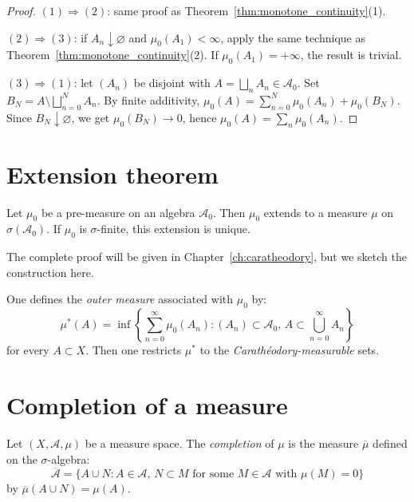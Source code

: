 \begin{proof}
$(1) \Rightarrow (2)$: same proof as Theorem~\ref{thm:monotone_continuity}(1).

$(2) \Rightarrow (3)$: if $A_n \downarrow \varnothing$ and
$\mu_0(A_1) < \infty$, apply the same technique as
Theorem~\ref{thm:monotone_continuity}(2). If $\mu_0(A_1) = +\infty$, the result is
trivial.

$(3) \Rightarrow (1)$: let $(A_n)$ be disjoint with $A = \bigsqcup_n A_n \in
\mathcal{A}_0$. Set $B_N = A \setminus \bigsqcup_{n=0}^{N} A_n$. By finite
additivity, $\mu_0(A) = \sum_{n=0}^{N} \mu_0(A_n) + \mu_0(B_N)$. Since
$B_N \downarrow \varnothing$, we get $\mu_0(B_N) \to 0$, hence
$\mu_0(A) = \sum_n \mu_0(A_n)$.
\end{proof}

\section{Extension theorem}

\begin{theorem}
\label{thm:extension_preliminary}
Let $\mu_0$ be a pre-measure on an algebra $\mathcal{A}_0$. Then $\mu_0$ extends
to a measure $\mu$ on $\sigma(\mathcal{A}_0)$. If $\mu_0$ is $\sigma$-finite, this
extension is unique.
\end{theorem}

The complete proof will be given in Chapter~\ref{ch:caratheodory}, but we sketch
the construction here.

\begin{keyformulas}[title=\textbf{Outer measure construction}]
One defines the \emph{outer measure} associated with $\mu_0$ by:
\[
\mu^*(A) = \inf\left\{\sum_{n=0}^{\infty} \mu_0(A_n) :
(A_n) \subset \mathcal{A}_0,\, A \subset \bigcup_{n=0}^{\infty} A_n\right\}
\]
for every $A \subset X$. Then one restricts $\mu^*$ to the
\emph{Carath\'eodory-measurable} sets.
\end{keyformulas}

\section{Completion of a measure}

\begin{definition}[Completion]
Let $(X, \mathcal{A}, \mu)$ be a measure space. The \emph{completion} of $\mu$ is
the measure $\overline{\mu}$ defined on the $\sigma$-algebra:
\[
\overline{\mathcal{A}} = \{A \cup N : A \in \mathcal{A},\, N \subset M \text{ for
some } M \in \mathcal{A} \text{ with } \mu(M) = 0\}
\]
by $\overline{\mu}(A \cup N) = \mu(A)$.
\end{definition}

